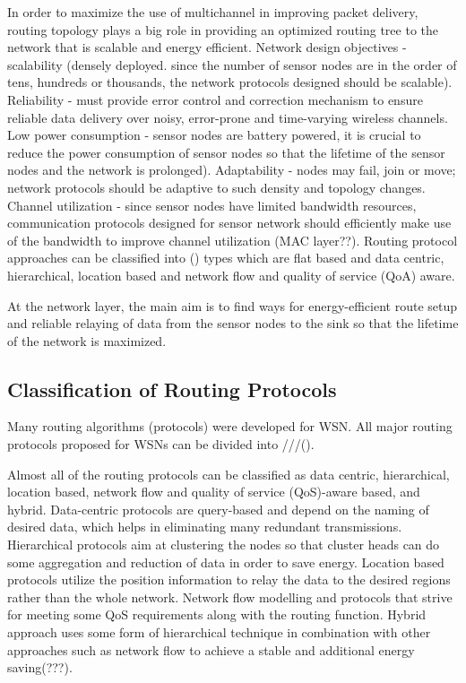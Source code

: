 In order to maximize the use of multichannel in improving packet delivery, routing topology plays a big role in providing an optimized routing tree to the network that is scalable and energy efficient. 
Network design objectives - scalability (densely deployed. since the number of sensor nodes are in the order of tens, hundreds or thousands, the network protocols designed should be scalable). Reliability - must provide error control and correction mechanism to ensure reliable data delivery over noisy, error-prone and time-varying wireless channels. Low power consumption - sensor nodes are battery powered, it is crucial to reduce the power consumption of sensor nodes so that the lifetime of the sensor nodes and the network is prolonged). Adaptability - nodes may fail, join or move; network protocols should be adaptive to such density and topology changes. Channel utilization - since sensor nodes have limited bandwidth resources, communication protocols designed for sensor network should efficiently make use of the bandwidth to improve channel utilization (MAC layer??).
Routing protocol approaches can be classified into () types which are flat based and data centric, hierarchical, location based and network flow and quality of service (QoA) aware.


At the network layer, the main aim is to find ways for energy-efficient route setup and reliable relaying of data from the sensor nodes to the sink so that the lifetime of the network is maximized.

\subsection{Classification of Routing Protocols}
Many routing algorithms (protocols) were developed for WSN. All major routing protocols proposed for WSNs can be divided into ///(). 

Almost all of the routing protocols can be classified as data centric, hierarchical, location based, network flow and quality of service (QoS)-aware based, and hybrid. Data-centric protocols are query-based and depend on the naming of desired data, which helps in eliminating many redundant transmissions. Hierarchical protocols aim at clustering the nodes so that cluster heads can do some aggregation and reduction of data in order to save energy. Location based protocols utilize the position information to relay the data to the desired regions rather than the whole network. Network flow modelling and protocols that strive for meeting some QoS requirements along with the routing function. \cite{akkaya2005survey}
Hybrid approach uses some form of hierarchical technique in combination with other approaches such as network flow to achieve a stable and additional energy saving(???).

